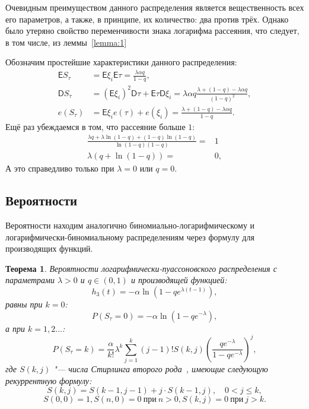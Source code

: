 \documentclass[12pt, specialist, subf, substylefile = spbu_report.rtx]{disser}
\newtheorem{theorem}{Теорема}
\begin{document}
	Очевидным преимуществом данного распределения является вещественность всех его параметров, а также, в принципе, их количество: два против трёх. Однако было утеряно свойство переменчивости знака логарифма рассеяния, что следует, в том числе, из леммы~\ref{lemma:1}
	
	Обозначим простейшие характеристики данного распределения:
	\[
		\begin{aligned}
			\mathsf{E} S _\tau &= \mathsf{E} \xi _i \mathsf{E} \tau = \frac {\lambda \alpha q} {1 - q},\\
			\mathsf{D} S _\tau &= \left( \mathsf{E} \xi _i \right) ^2 \mathsf{D} \tau + \mathsf{E} \tau \mathsf{D} \xi _i = \lambda \alpha q \frac {\lambda + (1 - q) - \lambda \alpha q} {(1 - q) ^2},\\
			e (S _\tau) &= \mathsf{E} \xi _i e (\tau) + e (\xi _i) = \frac {\lambda + (1 - q) - \lambda \alpha q} {1 - q}.
		\end{aligned}
	\]
	Ещё раз убеждаемся в том, что рассеяние больше $1$:
	\[
		\begin{aligned}
			\frac {\lambda q + \lambda \ln (1 - q) + (1 - q) \ln(1 - q)} {\ln(1 - q) (1 - q)} =& 1\\
			\lambda (q + \ln (1 - q)) =& 0,
		\end{aligned}
	\]
	А это справедливо только при $\lambda = 0$ или $q = 0$.
	
	\subsection{Вероятности}
	
	Вероятности находим аналогично биномиально-логарифмическому и логарифмически-биномиальному распределениям через формулу для производящих функций.

	\begin{theorem}
		\label{theorem:probLPR1}
		Вероятности логарифмически-пуассоновского распределения с параметрами $\lambda > 0$ и $q \in (0, 1)$ и производящей функцией:
		\[
		h _3 (t) = -\alpha \ln \left(1 - q e ^{\lambda (t - 1)}\right),
		\]
		равны при $k = 0$:
		\[
			P(S _\tau = 0) = -\alpha \ln\left(1 - q e ^{-\lambda}\right),
		\]
		а при $k = 1, 2 \dots$:
		\begin{equation}\label{lpr:prob1}
			P(S _\tau = k) = \frac \alpha {k !} \lambda ^k \sum \limits _{j = 1} ^{k} (j - 1)! S(k, j) \left(\frac {q e ^{-\lambda}} {1 - q e ^{-\lambda}}\right) ^j,
		\end{equation}
		где $S(k, j)$ "--- числа Стирлинга второго рода~\cite{bib:knuth1998}, имеющие следующую рекуррентную формулу:
		\[
			S(k, j) = S(k - 1, j - 1) + j \cdot S(k - 1, j), \quad 0 < j \leqslant k,
		\]
		\[
			S(0, 0) = 1, S(n, 0) = 0~ \text{при}~ n > 0, S(k, j) = 0~ \text{при}~ j > k.
		\]
	\end{theorem}
\end{document}
